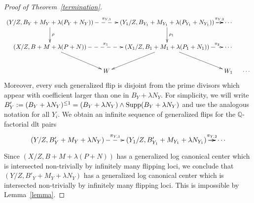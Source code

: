 \documentclass{amsart}
\renewcommand{\qq}{\mathbb{Q}}
\theoremstyle{remark}
\numberwithin{equation}{section}
\begin{document}
\begin{proof}[Proof of Theorem~\ref{termination}]
\[
 \xymatrix@C=1em{
(Y/Z,B_Y+M_Y+\lambda(P_Y+N_Y))\ar@{-->}[rr]^-{\pi_{Y,1}}\ar[d]^-{\rho} & & (Y_1/Z,B_{Y_1}+M_{Y_1}+\lambda(P_{Y_1}+N_{Y_1}))\ar@{-->}[r]^-{\pi_{Y,2}}\ar[d]^-{\rho_1} \ar[r]&\cdots \\ 
(X/Z,B+M+\lambda(P+N))\ar@{-->}[rr]^-{\pi_1}\ar[rd] & & (X_1/Z,B_1+M_1+\lambda(P_1+N_1))\ar@{-->}[r]^-{\pi_2}\ar[ld] \ar[rd]&  \cdots \\ 
& W & & W_1 & \cdots 
 }
\]
Moreover, every such generalized flip is disjoint from the prime divisors which appear with coefficient larger than one in $B_Y+\lambda N_Y$. 
For simplicity, we will write $B'_Y := (B_Y+\lambda N_Y)^{\leq 1} = (B_Y+\lambda N_Y) \wedge {\rm Supp}(B_Y+\lambda N_Y)$
and use the analogous notation for all $Y_i$. 
We obtain an infinite sequence of generalized flips for the $\qq$-factorial dlt pairs
\[
 \xymatrix@C=1em{
(Y/Z,B'_Y+M_Y+\lambda N_Y)\ar@{-->}[rr]^-{\pi_{Y,1}} & & (Y_1/Z,B'_{Y_1}+M_{Y_1}+\lambda N_{Y_1})\ar@{-->}[r]^-{\pi_{Y,2}} \ar[r]&  \cdots \\ 
 }
\]
Since $(X/Z,B+M+\lambda(P+N))$ has a generalized log canonical center which is intersected non-trivially by
infinitely many flipping loci, we conclude that $(Y/Z,B'_Y+M_Y+\lambda N_Y)$ has a generalized log canonical
center which is intersected non-trivially by infinitely many flipping loci.
This is impossible by Lemma~\ref{lemma}.


\end{proof}
\end{document}
